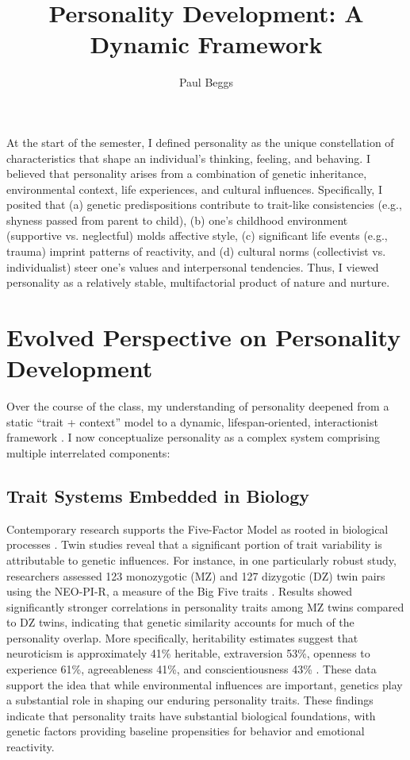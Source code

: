 \documentclass[stu]{apa7}
\title{Personality Development: A Dynamic Framework}
\author{Paul Beggs}
\begin{document}
\maketitle

At the start of the semester, I defined personality as the unique constellation of characteristics that shape an individual's thinking, feeling, and behaving. I believed that personality arises from a combination of genetic inheritance, environmental context, life experiences, and cultural influences. Specifically, I posited that (a) genetic predispositions contribute to trait-like consistencies (e.g., shyness passed from parent to child), (b) one's childhood environment (supportive vs. neglectful) molds affective style, (c) significant life events (e.g., trauma) imprint patterns of reactivity, and (d) cultural norms (collectivist vs. individualist) steer one's values and interpersonal tendencies. Thus, I viewed personality as a relatively stable, multifactorial product of nature and nurture.

\section{Evolved Perspective on Personality Development}

Over the course of the class, my understanding of personality deepened from a static ``trait + context'' model to a dynamic, lifespan-oriented, interactionist framework \parencite{burger2018personality}. I now conceptualize personality as a complex system comprising multiple interrelated components:

\subsection{Trait Systems Embedded in Biology}

Contemporary research supports the Five-Factor Model as rooted in biological processes \parencite{mccrae2008empirical}. Twin studies reveal that a significant portion of trait variability is attributable to genetic influences. For instance, in one particularly robust study, researchers assessed 123 monozygotic (MZ) and 127 dizygotic (DZ) twin pairs using the NEO-PI-R, a measure of the Big Five traits \parencite{jang1996heritability}. Results showed significantly stronger correlations in personality traits among MZ twins compared to DZ twins, indicating that genetic similarity accounts for much of the personality overlap. More specifically, heritability estimates suggest that neuroticism is approximately 41\% heritable, extraversion 53\%, openness to experience 61\%, agreeableness 41\%, and conscientiousness 43\% \parencite{jang1996heritability}. These data support the idea that while environmental influences are important, genetics play a substantial role in shaping our enduring personality traits. These findings indicate that personality traits have substantial biological foundations, with genetic factors providing baseline propensities for behavior and emotional reactivity.
\end{document}
